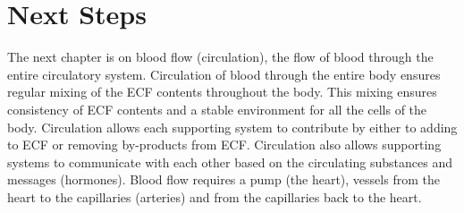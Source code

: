 \section{Next Steps}

The next chapter is on blood flow (circulation), the flow of blood through the entire circulatory system. Circulation of blood through the entire body ensures regular mixing of the ECF contents throughout the body. This mixing ensures consistency of ECF contents and a stable environment for all the cells of the body. Circulation allows each supporting system to contribute by either to adding to ECF or removing by-products from ECF. Circulation also allows supporting systems to communicate with each other based on the circulating substances and messages (hormones). Blood flow requires a pump (the heart), vessels from the heart to the capillaries (arteries) and from the capillaries back to the heart.

\printbibliography[heading=subbibintoc]
